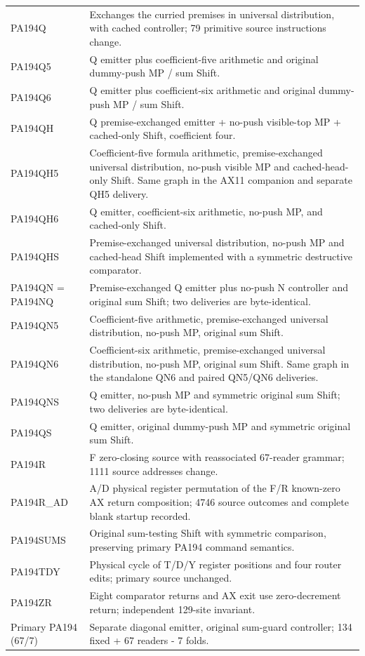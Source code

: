 \begin{longtable}{p{}p{}}
PA194Q & Exchanges the curried premises in universal distribution, with cached controller; 79 primitive source instructions change. \\
PA194Q5 & Q emitter plus coefficient-five arithmetic and original dummy-push MP / sum Shift. \\
PA194Q6 & Q emitter plus coefficient-six arithmetic and original dummy-push MP / sum Shift. \\
PA194QH & Q premise-exchanged emitter + no-push visible-top MP + cached-only Shift, coefficient four. \\
PA194QH5 & Coefficient-five formula arithmetic, premise-exchanged universal distribution, no-push visible MP and cached-head-only Shift. Same graph in the AX11 companion and separate QH5 delivery. \\
PA194QH6 & Q emitter, coefficient-six arithmetic, no-push MP, and cached-only Shift. \\
PA194QHS & Premise-exchanged universal distribution, no-push MP and cached-head Shift implemented with a symmetric destructive comparator. \\
PA194QN = PA194NQ & Premise-exchanged Q emitter plus no-push N controller and original sum Shift; two deliveries are byte-identical. \\
PA194QN5 & Coefficient-five arithmetic, premise-exchanged universal distribution, no-push MP, original sum Shift. \\
PA194QN6 & Coefficient-six arithmetic, premise-exchanged universal distribution, no-push MP, original sum Shift. Same graph in the standalone QN6 and paired QN5/QN6 deliveries. \\
PA194QNS & Q emitter, no-push MP and symmetric original sum Shift; two deliveries are byte-identical. \\
PA194QS & Q emitter, original dummy-push MP and symmetric original sum Shift. \\
PA194R & F zero-closing source with reassociated 67-reader grammar; 1111 source addresses change. \\
PA194R\_AD & A/D physical register permutation of the F/R known-zero AX return composition; 4746 source outcomes and complete blank startup recorded. \\
PA194SUMS & Original sum-testing Shift with symmetric comparison, preserving primary PA194 command semantics. \\
PA194TDY & Physical cycle of T/D/Y register positions and four router edits; primary source unchanged. \\
PA194ZR & Eight comparator returns and AX exit use zero-decrement return; independent 129-site invariant. \\
Primary PA194 (67/7) & Separate diagonal emitter, original sum-guard controller; 134 fixed + 67 readers - 7 folds. \\
\bottomrule\end{longtable}\endgroup
